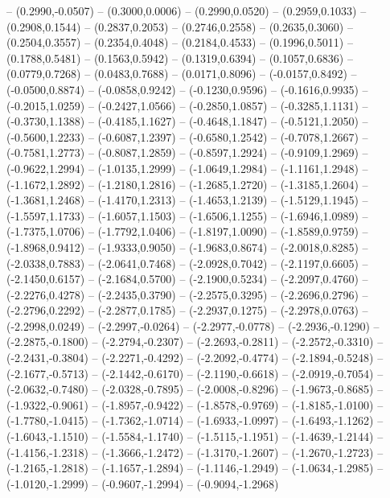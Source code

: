 {	-- (0.2990,-0.0507)
	-- (0.3000,0.0006)
	-- (0.2990,0.0520)
	-- (0.2959,0.1033)
	-- (0.2908,0.1544)
	-- (0.2837,0.2053)
	-- (0.2746,0.2558)
	-- (0.2635,0.3060)
	-- (0.2504,0.3557)
	-- (0.2354,0.4048)
	-- (0.2184,0.4533)
	-- (0.1996,0.5011)
	-- (0.1788,0.5481)
	-- (0.1563,0.5942)
	-- (0.1319,0.6394)
	-- (0.1057,0.6836)
	-- (0.0779,0.7268)
	-- (0.0483,0.7688)
	-- (0.0171,0.8096)
	-- (-0.0157,0.8492)
	-- (-0.0500,0.8874)
	-- (-0.0858,0.9242)
	-- (-0.1230,0.9596)
	-- (-0.1616,0.9935)
	-- (-0.2015,1.0259)
	-- (-0.2427,1.0566)
	-- (-0.2850,1.0857)
	-- (-0.3285,1.1131)
	-- (-0.3730,1.1388)
	-- (-0.4185,1.1627)
	-- (-0.4648,1.1847)
	-- (-0.5121,1.2050)
	-- (-0.5600,1.2233)
	-- (-0.6087,1.2397)
	-- (-0.6580,1.2542)
	-- (-0.7078,1.2667)
	-- (-0.7581,1.2773)
	-- (-0.8087,1.2859)
	-- (-0.8597,1.2924)
	-- (-0.9109,1.2969)
	-- (-0.9622,1.2994)
	-- (-1.0135,1.2999)
	-- (-1.0649,1.2984)
	-- (-1.1161,1.2948)
	-- (-1.1672,1.2892)
	-- (-1.2180,1.2816)
	-- (-1.2685,1.2720)
	-- (-1.3185,1.2604)
	-- (-1.3681,1.2468)
	-- (-1.4170,1.2313)
	-- (-1.4653,1.2139)
	-- (-1.5129,1.1945)
	-- (-1.5597,1.1733)
	-- (-1.6057,1.1503)
	-- (-1.6506,1.1255)
	-- (-1.6946,1.0989)
	-- (-1.7375,1.0706)
	-- (-1.7792,1.0406)
	-- (-1.8197,1.0090)
	-- (-1.8589,0.9759)
	-- (-1.8968,0.9412)
	-- (-1.9333,0.9050)
	-- (-1.9683,0.8674)
	-- (-2.0018,0.8285)
	-- (-2.0338,0.7883)
	-- (-2.0641,0.7468)
	-- (-2.0928,0.7042)
	-- (-2.1197,0.6605)
	-- (-2.1450,0.6157)
	-- (-2.1684,0.5700)
	-- (-2.1900,0.5234)
	-- (-2.2097,0.4760)
	-- (-2.2276,0.4278)
	-- (-2.2435,0.3790)
	-- (-2.2575,0.3295)
	-- (-2.2696,0.2796)
	-- (-2.2796,0.2292)
	-- (-2.2877,0.1785)
	-- (-2.2937,0.1275)
	-- (-2.2978,0.0763)
	-- (-2.2998,0.0249)
	-- (-2.2997,-0.0264)
	-- (-2.2977,-0.0778)
	-- (-2.2936,-0.1290)
	-- (-2.2875,-0.1800)
	-- (-2.2794,-0.2307)
	-- (-2.2693,-0.2811)
	-- (-2.2572,-0.3310)
	-- (-2.2431,-0.3804)
	-- (-2.2271,-0.4292)
	-- (-2.2092,-0.4774)
	-- (-2.1894,-0.5248)
	-- (-2.1677,-0.5713)
	-- (-2.1442,-0.6170)
	-- (-2.1190,-0.6618)
	-- (-2.0919,-0.7054)
	-- (-2.0632,-0.7480)
	-- (-2.0328,-0.7895)
	-- (-2.0008,-0.8296)
	-- (-1.9673,-0.8685)
	-- (-1.9322,-0.9061)
	-- (-1.8957,-0.9422)
	-- (-1.8578,-0.9769)
	-- (-1.8185,-1.0100)
	-- (-1.7780,-1.0415)
	-- (-1.7362,-1.0714)
	-- (-1.6933,-1.0997)
	-- (-1.6493,-1.1262)
	-- (-1.6043,-1.1510)
	-- (-1.5584,-1.1740)
	-- (-1.5115,-1.1951)
	-- (-1.4639,-1.2144)
	-- (-1.4156,-1.2318)
	-- (-1.3666,-1.2472)
	-- (-1.3170,-1.2607)
	-- (-1.2670,-1.2723)
	-- (-1.2165,-1.2818)
	-- (-1.1657,-1.2894)
	-- (-1.1146,-1.2949)
	-- (-1.0634,-1.2985)
	-- (-1.0120,-1.2999)
	-- (-0.9607,-1.2994)
	-- (-0.9094,-1.2968)
}

